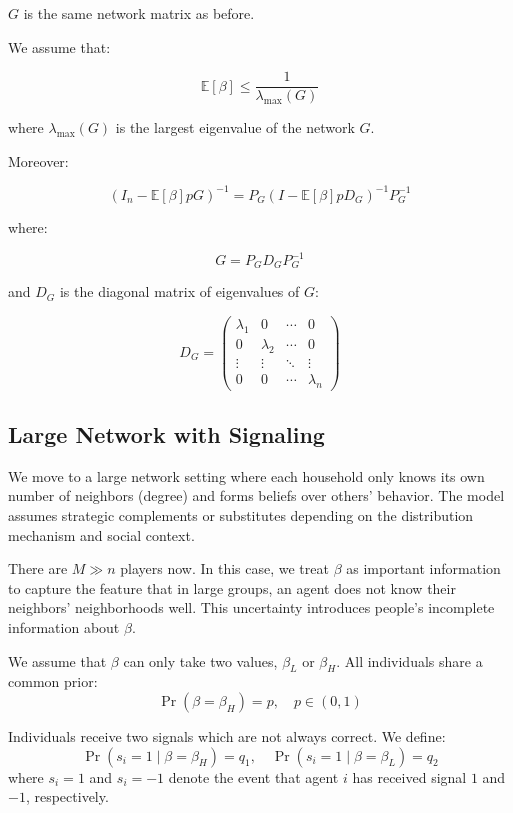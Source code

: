 \documentclass[12pt]{article}
\begin{document}
$G$ is the same network matrix as before.

\vspace{1em}

We assume that:

\[
\mathbb{E}[\beta] \leq \frac{1}{\lambda_{\text{max}}(G)}
\]

where $\lambda_{\text{max}}(G)$ is the largest eigenvalue of the network $G$.

\vspace{1em}

Moreover:

\[
(I_n - \mathbb{E}[\beta] p G)^{-1} = P_G \left( I - \mathbb{E}[\beta] p D_G \right)^{-1} P_G^{-1}
\]

where:

\[
G = P_G D_G P_G^{-1}
\]

and $D_G$ is the diagonal matrix of eigenvalues of $G$:

\[
D_G = 
\begin{pmatrix}
\lambda_1 & 0 & \cdots & 0 \\
0 & \lambda_2 & \cdots & 0 \\
\vdots & \vdots & \ddots & \vdots \\
0 & 0 & \cdots & \lambda_n
\end{pmatrix}
\]

\subsection{Large Network with Signaling}
We move to a large network setting where each household only knows its own number of neighbors (degree) and forms beliefs over others' behavior. The model assumes strategic complements or substitutes depending on the distribution mechanism and social context.

There are $M \gg n$ players now. In this case, we treat $\beta$ as important information to capture the feature that in large groups, an agent does not know their neighbors' neighborhoods well.  
This uncertainty introduces people's incomplete information about $\beta$.

We assume that $\beta$ can only take two values, $\beta_L$ or $\beta_H$.  
All individuals share a common prior:
\[
\Pr(\beta = \beta_H) = p, \quad p \in (0,1)
\]

Individuals receive two signals which are not always correct.  
We define:
\[
\Pr(s_i = 1 \mid \beta = \beta_H) = q_1, \quad \Pr(s_i = 1 \mid \beta = \beta_L) = q_2
\]
where $s_i = 1$ and $s_i = -1$ denote the event that agent $i$ has received signal $1$ and $-1$, respectively.
\end{document}

